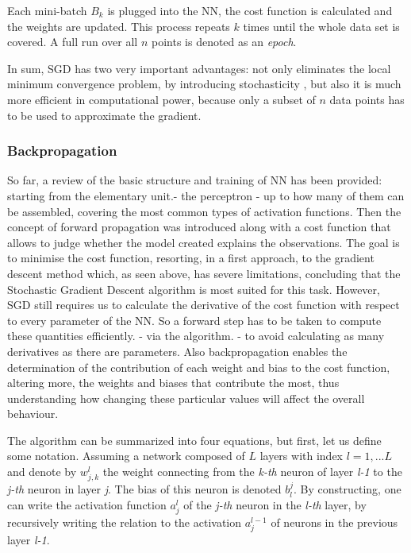 Each mini-batch $B_k$ is plugged into the NN, the cost function is calculated and the weights are updated. This process repeats $k$ times until the whole data set is covered. A full run over all $n$ points is denoted as an \textit{epoch}. \cite{ml_phys}

In sum, SGD has two very important advantages: not only eliminates the local minimum convergence problem, by introducing stochasticity , but also it is much more efficient in computational power, because only a subset of $n$ data points has to be used to approximate the gradient.


\subsubsection{Backpropagation}

So far, a review of the basic structure and training of NN has been provided: starting from the elementary unit.- the perceptron - up to how many of them can be assembled, covering the most common types of activation functions. Then the concept of forward propagation was introduced along with a cost function that allows to judge whether the model created explains the observations. The goal is to minimise the cost function, resorting, in a first approach, to the gradient descent method which, as seen above, has severe limitations, concluding that the Stochastic Gradient Descent algorithm is most suited for this task. However, SGD still requires us to calculate the derivative of the cost function with respect to every parameter of the NN. So a forward step has to be taken to compute these quantities efficiently. - via the  algorithm. - to avoid calculating as many derivatives as there are parameters. Also backpropagation enables the determination of the contribution of each weight and bias to the cost function, altering more, the weights and biases that contribute the most, thus understanding how changing these particular values will affect the overall behaviour. \cite{nielsenneural}

The algorithm can be summarized into four equations, but first, let us define some notation. Assuming a network composed of $L$ layers with index $l = {1,... L}$ and denote by $w_{j,k}^l$ the weight connecting from the \textit{k-th} neuron of layer \textit{l-1} to the \textit{j-th} neuron in layer \textit{j}. The bias of this neuron is denoted $b_l^j$. By constructing, one can write the activation function $a_j^l$ of the  \textit{j-th} neuron in the  \textit{l-th} layer, by recursively writing the relation to the activation $a_j^{l-1}$ of neurons in the previous layer \textit{l-1}.

